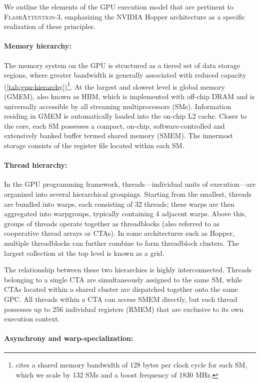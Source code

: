 We outline the elements of the GPU execution model that are pertinent to \textsc{FlashAttention-3}, emphasizing the NVIDIA Hopper architecture as a specific realization of these principles.

\paragraph{Memory hierarchy:} The memory system on the GPU is structured as a tiered set of data storage regions, where greater bandwidth is generally associated with reduced capacity (\cref{tab:gpu-hierarchy})\footnote{\citet{luo2024benchmarking} cites a shared memory bandwidth of 128 bytes per clock cycle for each SM, which we scale by 132 SMs and a boost frequency of 1830 MHz.}. At the largest and slowest level is global memory (GMEM), also known as HBM, which is implemented with off-chip DRAM and is universally accessible by all streaming multiprocessors (SMs). Information residing in GMEM is automatically loaded into the on-chip L2 cache. Closer to the core, each SM possesses a compact, on-chip, software-controlled and extensively banked buffer termed shared memory (SMEM). The innermost storage consists of the register file located within each SM.

\paragraph{Thread hierarchy:} In the GPU programming framework, threads—individual units of execution—are organized into several hierarchical groupings. Starting from the smallest, threads are bundled into warps, each consisting of 32 threads; these warps are then aggregated into warpgroups, typically containing 4 adjacent warps. Above this, groups of threads operate together as threadblocks (also referred to as cooperative thread arrays or CTAs). In some architectures such as Hopper, multiple threadblocks can further combine to form threadblock clusters. The largest collection at the top level is known as a grid.

The relationship between these two hierarchies is highly interconnected. Threads belonging to a single CTA are simultaneously assigned to the same SM, while CTAs located within a shared cluster are dispatched together onto the same GPC. All threads within a CTA can access SMEM directly, but each thread possesses up to 256 individual registers (RMEM) that are exclusive to its own execution context.

\paragraph{Asynchrony and warp-specialization:}


